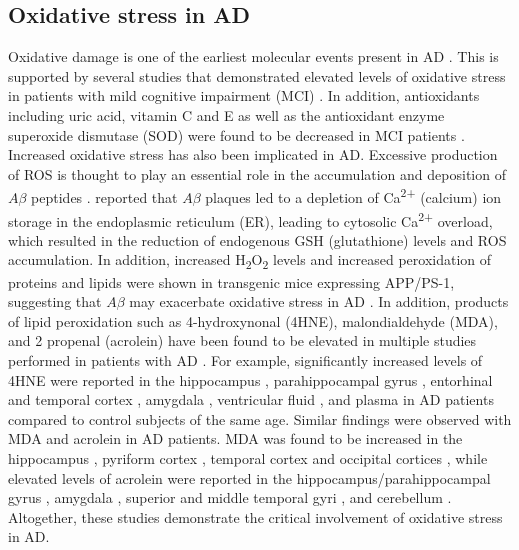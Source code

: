 \subsection{Oxidative stress in AD}
Oxidative damage is one of the earliest molecular events present in AD \citep{Nunomura2001}. This is supported by several studies that demonstrated elevated levels of oxidative stress in patients with mild cognitive impairment (MCI) \citep{Ansari2010,Pratico2004,Williams2006}. In addition, antioxidants including uric acid, vitamin C and E as well as the antioxidant enzyme superoxide dismutase (SOD) were found to be decreased in MCI patients \citep{Rinaldi2003,Torres2011}. Increased oxidative stress has also been implicated in AD. Excessive production of ROS is thought to play an essential role in the accumulation and deposition of $A\beta$ peptides \citep{Bonda2010}. \citet{Ferreiro2008} reported that $A\beta$ plaques led to a depletion of Ca\textsuperscript{2+}  (calcium) ion storage in the endoplasmic reticulum (ER), leading to cytosolic Ca\textsuperscript{2+} overload, which resulted in the reduction of endogenous GSH (glutathione) levels and ROS accumulation. In addition, increased H\textsubscript{2}O\textsubscript{2} levels and increased peroxidation of proteins and lipids were shown in transgenic mice expressing APP/PS-1, suggesting that $A\beta$ may exacerbate oxidative stress in AD \citep{Matsuoka2001,Zhao2013}. In addition, products of lipid peroxidation such as 4-hydroxynonal (4HNE), malondialdehyde (MDA), and 2 propenal (acrolein) have been found to be elevated in multiple studies performed in patients with AD \citep{Wang2014,Zhao2013}. For example, significantly increased levels of 4HNE were reported in the hippocampus \citep{Lovell1995,Markesbery1998,Montine1998}, parahippocampal gyrus \citep{Markesbery1998}, entorhinal and temporal cortex \citep{Montine1998}, amygdala \citep{Lovell1995,Markesbery1998}, ventricular fluid \citep{Lovell1997}, and plasma \citep{McGrath2001} in AD patients compared to control subjects of the same age. Similar findings were observed with MDA and acrolein in AD patients. MDA was found to be increased in the hippocampus \citep{Lovell1995}, pyriform cortex \citep{Lovell1995}, temporal cortex \citep{Marcus1998,Palmer1994} and occipital cortices \citep{Miranda2000}, while elevated levels of acrolein were reported in the hippocampus/parahippocampal gyrus \citep{Bradley2010,Calingasan1999,Lovell2001,Williams2006}, amygdala \citep{Lovell2001}, superior and middle temporal gyri \citep{Bradley2010,Williams2006}, and cerebellum \citep{Bradley2010,Williams2006}. Altogether, these studies demonstrate the critical involvement of oxidative stress in AD.

